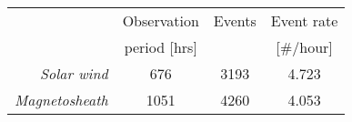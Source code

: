 
\begin{tabular}{rccc}
\hline
                        & Observation   & Events &  Event rate \\
                        & period [hrs]  &        &  [\#/hour]  \\
\hline
\textit{Solar wind}     & 676           &  3193  & 4.723 \\
\textit{Magnetosheath}  & 1051          &  4260  & 4.053 \\
\hline
\end{tabular}